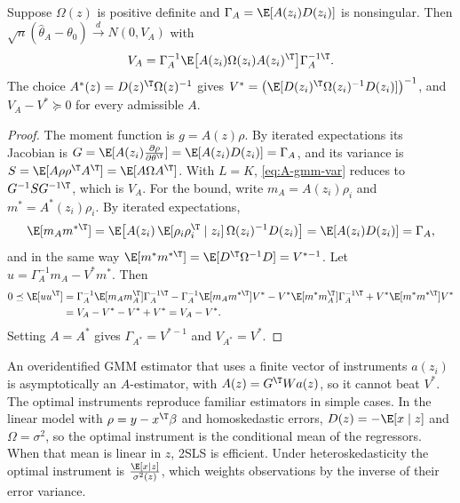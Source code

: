 \begin{proposition}\label{prop:A-optimal-iv}
Suppose $\Omega(z)$ is positive definite and $\Gamma_A = \E[A(z_i)D(z_i)]$ is nonsingular. Then
$\sqrt{n}(\hat\theta_A - \theta_0) \xrightarrow{d} N(0, V_A)$ with
\begin{equation*}
  V_A = \Gamma_A^{-1}\E\big[A(z_i)\Omega(z_i)A(z_i)^\T\big]\Gamma_A^{-1\T}.
\end{equation*}
The choice $A^*(z) = D(z)^\T\Omega(z)^{-1}$ gives $V^* = \big(\E[D(z_i)^\T\Omega(z_i)^{-1}D(z_i)]\big)^{-1}$, and
$V_A - V^* \succeq 0$ for every admissible $A$.
\end{proposition}

\begin{proof}
The moment function is $g = A(z)\rho$. By iterated expectations its Jacobian is $G = \E[A(z_i)\frac{\partial\rho}{\partial
\theta^\T}] = \E[A(z_i)D(z_i)] = \Gamma_A$, and its variance is $S = \E[A\rho\rho^\T A^\T] = \E[A\Omega A^\T]$. With
$L = K$, \eqref{eq:A-gmm-var} reduces to $G^{-1}SG^{-1\T}$, which is $V_A$. For the bound, write $m_A = A(z_i)\rho_i$ and
$m^* = A^*(z_i)\rho_i$. By iterated expectations,
\begin{equation*}
  \E[m_Am^{*\T}] = \E\big[A(z_i)\,\E[\rho_i\rho_i^\T \mid z_i]\,\Omega(z_i)^{-1}D(z_i)\big] = \E[A(z_i)D(z_i)] = \Gamma_A,
\end{equation*}
and in the same way $\E[m^*m^{*\T}] = \E[D^\T\Omega^{-1}D] = V^{*-1}$. Let $u = \Gamma_A^{-1}m_A - V^*m^*$. Then
\begin{align*}
  0 \preceq \E[uu^\T] &= \Gamma_A^{-1}\E[m_Am_A^\T]\Gamma_A^{-1\T} - \Gamma_A^{-1}\E[m_Am^{*\T}]V^*
  - V^*\E[m^*m_A^\T]\Gamma_A^{-1\T} + V^*\E[m^*m^{*\T}]V^* \\
  &= V_A - V^* - V^* + V^* = V_A - V^*.
\end{align*}
Setting $A = A^*$ gives $\Gamma_{A^*} = V^{*-1}$ and $V_{A^*} = V^*$.
\end{proof}

An overidentified GMM estimator that uses a finite vector of instruments $a(z_i)$ is asymptotically an $A$-estimator, with
$A(z) = G^\T W a(z)$, so it cannot beat $V^*$. The optimal instruments reproduce familiar estimators in
simple cases. In the linear model with $\rho = y - x^\T\beta$ and homoskedastic errors, $D(z) = -\E[x \mid z]$ and
$\Omega = \sigma^2$, so the optimal instrument is the conditional mean of the regressors. When that mean is linear in
$z$, 2SLS is efficient. Under heteroskedasticity the optimal instrument is $\frac{\E[x \mid z]}{\sigma^2(z)}$, which
weights observations by the inverse of their error variance.

